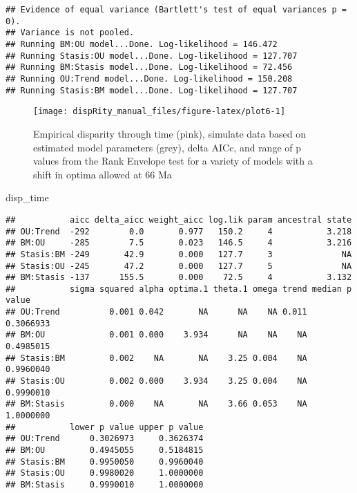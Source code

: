 \documentclass[
]{book}
\newenvironment{Shaded}{\begin{snugshade}}{\end{snugshade}}
\newcommand{\NormalTok}[1]{#1}
\begin{document}
\begin{verbatim}
## Evidence of equal variance (Bartlett's test of equal variances p = 0).
## Variance is not pooled.
## Running BM:OU model...Done. Log-likelihood = 146.472
## Running Stasis:OU model...Done. Log-likelihood = 127.707
## Running BM:Stasis model...Done. Log-likelihood = 72.456
## Running OU:Trend model...Done. Log-likelihood = 150.208
## Running Stasis:BM model...Done. Log-likelihood = 127.707
\end{verbatim}

\begin{figure}

{\centering \texttt{[image: dispRity\_manual\_files/figure-latex/plot6-1]} 

}

\caption{Empirical disparity through time (pink), simulate data based on estimated model parameters (grey), delta AICc, and range of p values from the Rank Envelope test for a variety of models with a shift in optima allowed at 66 Ma}\label{fig:plot6}
\end{figure}

\begin{Shaded}
\begin{Highlighting}[]
\NormalTok{disp\_time}
\end{Highlighting}
\end{Shaded}

\begin{verbatim}
##           aicc delta_aicc weight_aicc log.lik param ancestral state
## OU:Trend  -292        0.0       0.977   150.2     4           3.218
## BM:OU     -285        7.5       0.023   146.5     4           3.216
## Stasis:BM -249       42.9       0.000   127.7     3              NA
## Stasis:OU -245       47.2       0.000   127.7     5              NA
## BM:Stasis -137      155.5       0.000    72.5     4           3.132
##           sigma squared alpha optima.1 theta.1 omega trend median p value
## OU:Trend          0.001 0.042       NA      NA    NA 0.011      0.3066933
## BM:OU             0.001 0.000    3.934      NA    NA    NA      0.4985015
## Stasis:BM         0.002    NA       NA    3.25 0.004    NA      0.9960040
## Stasis:OU         0.002 0.000    3.934    3.25 0.004    NA      0.9990010
## BM:Stasis         0.000    NA       NA    3.66 0.053    NA      1.0000000
##           lower p value upper p value
## OU:Trend      0.3026973     0.3626374
## BM:OU         0.4945055     0.5184815
## Stasis:BM     0.9950050     0.9960040
## Stasis:OU     0.9980020     1.0000000
## BM:Stasis     0.9990010     1.0000000
\end{verbatim}
\end{document}

